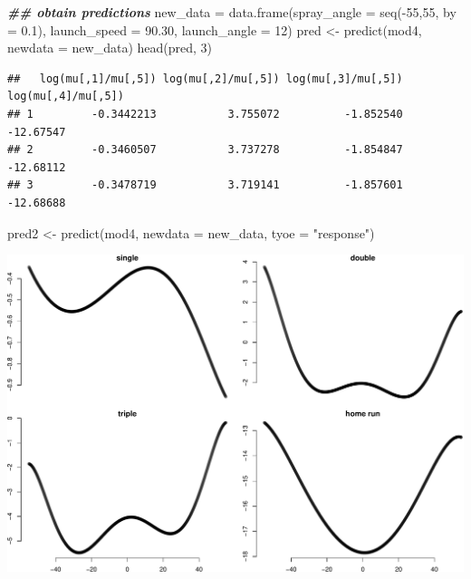 \documentclass[
  ignorenonframetext,
]{beamer}
\newenvironment{Shaded}{\begin{snugshade}}{\end{snugshade}}
\newcommand{\AttributeTok}[1]{\textcolor[rgb]{0.77,0.63,0.00}{#1}}
\newcommand{\DecValTok}[1]{\textcolor[rgb]{0.00,0.00,0.81}{#1}}
\newcommand{\DocumentationTok}[1]{\textcolor[rgb]{0.56,0.35,0.01}{\textbf{\textit{#1}}}}
\newcommand{\FloatTok}[1]{\textcolor[rgb]{0.00,0.00,0.81}{#1}}
\newcommand{\FunctionTok}[1]{\textcolor[rgb]{0.00,0.00,0.00}{#1}}
\newcommand{\NormalTok}[1]{#1}
\newcommand{\OtherTok}[1]{\textcolor[rgb]{0.56,0.35,0.01}{#1}}
\newcommand{\SpecialCharTok}[1]{\textcolor[rgb]{0.00,0.00,0.00}{#1}}
\newcommand{\StringTok}[1]{\textcolor[rgb]{0.31,0.60,0.02}{#1}}
\begin{document}
\begin{frame}[fragile]{}
\begin{Shaded}
\begin{Highlighting}[]
\DocumentationTok{\#\# obtain predictions}
\NormalTok{new\_data }\OtherTok{=} \FunctionTok{data.frame}\NormalTok{(}\AttributeTok{spray\_angle =} \FunctionTok{seq}\NormalTok{(}\SpecialCharTok{{-}}\DecValTok{55}\NormalTok{,}\DecValTok{55}\NormalTok{, }\AttributeTok{by =} \FloatTok{0.1}\NormalTok{), }
           \AttributeTok{launch\_speed =} \FloatTok{90.30}\NormalTok{, }
           \AttributeTok{launch\_angle =} \DecValTok{12}\NormalTok{)}
\NormalTok{pred }\OtherTok{\textless{}{-}} \FunctionTok{predict}\NormalTok{(mod4, }\AttributeTok{newdata =}\NormalTok{ new\_data)}
\FunctionTok{head}\NormalTok{(pred, }\DecValTok{3}\NormalTok{)}
\end{Highlighting}
\end{Shaded}

\begin{verbatim}
##   log(mu[,1]/mu[,5]) log(mu[,2]/mu[,5]) log(mu[,3]/mu[,5]) log(mu[,4]/mu[,5])
## 1         -0.3442213           3.755072          -1.852540          -12.67547
## 2         -0.3460507           3.737278          -1.854847          -12.68112
## 3         -0.3478719           3.719141          -1.857601          -12.68688
\end{verbatim}

\begin{Shaded}
\begin{Highlighting}[]
\NormalTok{pred2 }\OtherTok{\textless{}{-}} \FunctionTok{predict}\NormalTok{(mod4, }\AttributeTok{newdata =}\NormalTok{ new\_data, }\AttributeTok{tyoe =} \StringTok{"response"}\NormalTok{)}
\end{Highlighting}
\end{Shaded}
\end{frame}

\begin{frame}{}
\protect\hypertarget{section-16}{}
\includegraphics{week6_p1_files/figure-beamer/unnamed-chunk-4-1.pdf}
\end{frame}
\end{document}
